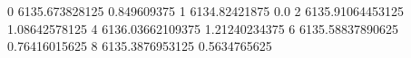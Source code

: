 0 6135.673828125 0.849609375
1 6134.82421875 0.0
2 6135.91064453125 1.08642578125
4 6136.03662109375 1.21240234375
6 6135.58837890625 0.76416015625
8 6135.3876953125 0.5634765625
